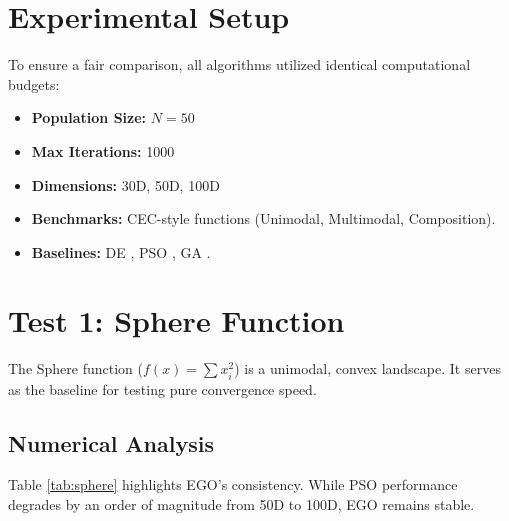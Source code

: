 \documentclass[conference]{IEEEtran}
\begin{document}
\section{Experimental Setup}
To ensure a fair comparison, all algorithms utilized identical computational budgets:
\begin{itemize}
    \item \textbf{Population Size:} $N=50$
    \item \textbf{Max Iterations:} 1000
    \item \textbf{Dimensions:} 30D, 50D, 100D
    \item \textbf{Benchmarks:} CEC-style functions (Unimodal, Multimodal, Composition).
    \item \textbf{Baselines:} DE \cite{b7}, PSO \cite{b2}, GA \cite{b3}.
\end{itemize}

\section{Test 1: Sphere Function}
The Sphere function ($f(x) = \sum x_i^2$) is a unimodal, convex landscape. It serves as the baseline for testing pure convergence speed.

\subsection{Numerical Analysis}
Table \ref{tab:sphere} highlights EGO's consistency. While PSO performance degrades by an order of magnitude from 50D to 100D, EGO remains stable.

\begin{table}[htbp]
\centering
\caption{Sphere Function: Mean Best Fitness}
\label{tab:sphere}
\end{table}
\end{document}
